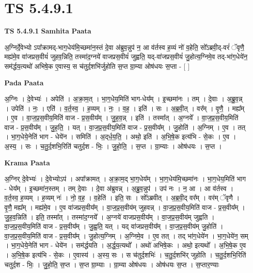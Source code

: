 \documentclass[17pt]{extarticle}
\begin{document}
\section{ TS 5.4.9.1 }

\textbf{TS 5.4.9.1 } \newline
\textbf{Samhita Paata} \newline

अ॒ग्निर्दे॒वेभ्यो ऽपा᳚क्रामद्-भाग॒धेय॑मि॒च्छमा॑न॒स्तं दे॒वा अ॑ब्रुव॒न्नुप॑ न॒ आ व॑र्तस्व ह॒व्यं नो॑ व॒हेति॒ सो᳚ऽब्रवी॒द्-वरं॑ ॅवृणै॒ मह्य॑मे॒व वा॑जप्रस॒वीयं॑ जुहव॒न्निति॒ तस्मा॑द॒ग्नये॑ वाजप्रस॒वीयं॑ जुह्वति॒ यद्-वा॑जप्रस॒वीयं॑ जु॒होत्य॒ग्निमे॒व तद्-भा॑ग॒धेये॑न॒ सम॑र्द्धय॒त्यथो॑ अभिषे॒क ए॒वास्य॒ स च॑तुर्द॒शभि॑र्जुहोति स॒प्त ग्रा॒म्या ओष॑धयः स॒प्ता - [  ] \newline

\textbf{Pada Paata} \newline

अ॒ग्निः । दे॒वेभ्यः॑ । अपेति॑ । अ॒क्रा॒म॒त् । भा॒ग॒धेय॒मिति॑ भाग-धेय᳚म् । इ॒च्छमा॑नः । तम् । दे॒वाः । अ॒ब्रु॒व॒न्न् । उपेति॑ । नः॒ । एति॑ । व॒र्त॒स्व॒ । ह॒व्यम् । नः॒ । व॒ह॒ । इति॑ । सः । अ॒ब्र॒वी॒त् । वर᳚म् । वृ॒णै॒ । मह्य᳚म् । ए॒व । वा॒ज॒प्र॒स॒वीय॒मिति॑ वाज - प्र॒स॒वीय᳚म् । जु॒ह॒व॒न्न् । इति॑ । तस्मा᳚त् । अ॒ग्नये᳚ । वा॒ज॒प्र॒स॒वीय॒मिति॑ वाज - प्र॒स॒वीय᳚म् । जु॒ह॒ति॒ । यत् । वा॒ज॒प्र॒स॒वीय॒मिति॑ वाज - प्र॒स॒वीय᳚म् । जु॒होति॑ । अ॒ग्निम् । ए॒व । तत् । भा॒ग॒धेये॒नेति॑ भाग - धेये॑न । समिति॑ । अ॒द्‌र्ध॒य॒ति॒ । अथो॒ इति॑ । अ॒भि॒षे॒क इत्य॑भि - से॒कः । ए॒व । अ॒स्य॒ । सः । च॒तु॒र्द॒शभि॒रिति॑ चतुर्द॒श - भिः॒ । जु॒हो॒ति॒ । स॒प्त । ग्रा॒म्याः । ओष॑धयः । स॒प्त ।  \newline


\textbf{Krama Paata} \newline

अ॒ग्निर् दे॒वेभ्यः॑ । दे॒वेभ्योऽप॑ । अपा᳚क्रामत् । अ॒क्रा॒म॒द् भा॒ग॒धेय᳚म् । भा॒ग॒धेय॑मि॒च्छमा॑नः । भा॒ग॒धेय॒मिति॑ भाग - धेय᳚म् । इ॒च्छमा॑न॒स्तम् । तम् दे॒वाः । दे॒वा अ॑ब्रुवन्न् । अ॒ब्रु॒व॒न्नुप॑ । उप॑ नः । न॒ आ । आ व॑र्तस्व । व॒र्त॒स्व॒ ह॒व्यम् । ह॒व्यम् नः॑ । नो॒ व॒ह॒ । व॒हेति॑ । इति॒ सः । सो᳚ऽब्रवीत् । अ॒ब्र॒वी॒द् वर᳚म् । वर॑म् ॅवृणै । वृ॒णै॒ मह्य᳚म् । मह्य॑मे॒व । ए॒व वा॑जप्रस॒वीय᳚म् । वा॒ज॒प्र॒स॒वीय॑म् जुहवन्न् । वा॒ज॒प्र॒स॒वीय॒मिति॑ वाज - प्र॒स॒वीय᳚म् । जु॒ह॒व॒न्निति॑ । इति॒ तस्मा᳚त् । तस्मा॑द॒ग्नये᳚ । अ॒ग्नये॑ वाजप्रस॒वीय᳚म् । वा॒ज॒प्र॒स॒वीय॑म् जुह्वति । वा॒ज॒प्र॒स॒वीय॒मिति॑ वाज - प्र॒स॒वीय᳚म् । जु॒ह्व॒ति॒ यत् । यद् वा॑जप्रस॒वीय᳚म् । वा॒ज॒प्र॒स॒वीय॑म् जु॒होति॑ । वा॒ज॒प्र॒स॒वीय॒मिति॑ वाज - प्र॒स॒वीय᳚म् । जु॒होत्य॒ग्निम् । अ॒ग्निमे॒व । ए॒व तत् । तद् भा॑ग॒धेये॑न । भा॒ग॒धेये॑न॒ सम् । भा॒ग॒धेये॒नेति॑ भाग - धेये॑न । सम॑र्द्धयति । अ॒र्द्ध॒य॒त्यथो᳚ । अथो॑ अभिषे॒कः । अथो॒ इत्यथो᳚ । अ॒भि॒षे॒क ए॒व । अ॒भि॒षे॒क इत्य॑भि - से॒कः । ए॒वास्य॑ । अ॒स्य॒ सः । स च॑तुर्द॒शभिः॑ । च॒तु॒र्द॒शभि॑र् जुहोति । च॒तु॒र्द॒शभि॒रिति॑ चतुर्द॒श - भिः॒ । जु॒हो॒ति॒ स॒प्त । स॒प्त ग्रा॒म्याः । ग्रा॒म्या ओष॑धयः । ओष॑धयः स॒प्त । स॒प्तार॒ण्याः \newline
\end{document}
